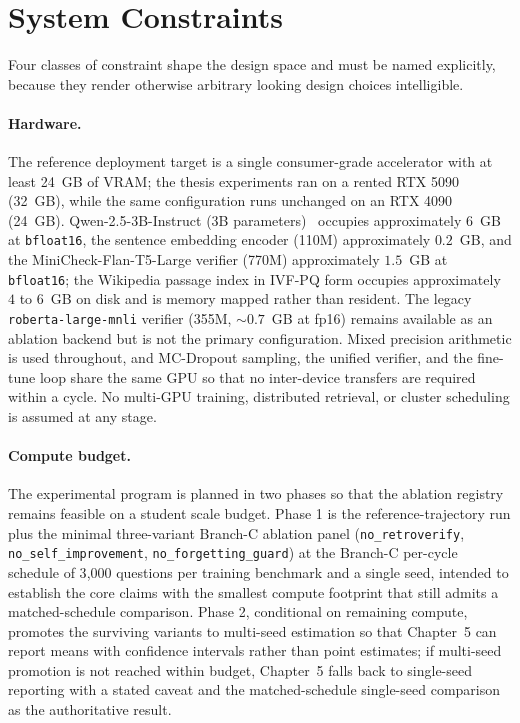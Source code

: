 \section{System Constraints}
\label{sec:constraints}

Four classes of constraint shape the design space and must be named explicitly, because they render otherwise arbitrary looking design choices intelligible.

\paragraph{Hardware.} The reference deployment target is a single consumer-grade accelerator with at least 24~GB of VRAM; the thesis experiments ran on a rented RTX 5090 (32~GB), while the same configuration runs unchanged on an RTX 4090 (24~GB). Qwen-2.5-3B-Instruct (3B parameters)~\citep{qwen25} occupies approximately $6$~GB at \texttt{bfloat16}, the sentence embedding encoder (110M) approximately $0.2$~GB, and the MiniCheck-Flan-T5-Large verifier (770M) approximately $1.5$~GB at \texttt{bfloat16}; the Wikipedia passage index in IVF-PQ form occupies approximately $4$ to $6$~GB on disk and is memory mapped rather than resident. The legacy \texttt{roberta-large-mnli} verifier (355M, ${\sim}0.7$~GB at fp16) remains available as an ablation backend but is not the primary configuration. Mixed precision arithmetic is used throughout, and MC-Dropout sampling, the unified verifier, and the fine-tune loop share the same GPU so that no inter-device transfers are required within a cycle. No multi-GPU training, distributed retrieval, or cluster scheduling is assumed at any stage.

\paragraph{Compute budget.} The experimental program is planned in two phases so that the ablation registry remains feasible on a student scale budget. Phase 1 is the reference-trajectory run plus the minimal three-variant Branch-C ablation panel (\texttt{no\_retroverify}, \texttt{no\_self\_improvement}, \texttt{no\_forgetting\_guard}) at the Branch-C per-cycle schedule of 3{,}000 questions per training benchmark and a single seed, intended to establish the core claims with the smallest compute footprint that still admits a matched-schedule comparison. Phase 2, conditional on remaining compute, promotes the surviving variants to multi-seed estimation so that Chapter~5 can report means with confidence intervals rather than point estimates; if multi-seed promotion is not reached within budget, Chapter~5 falls back to single-seed reporting with a stated caveat and the matched-schedule single-seed comparison as the authoritative result.

